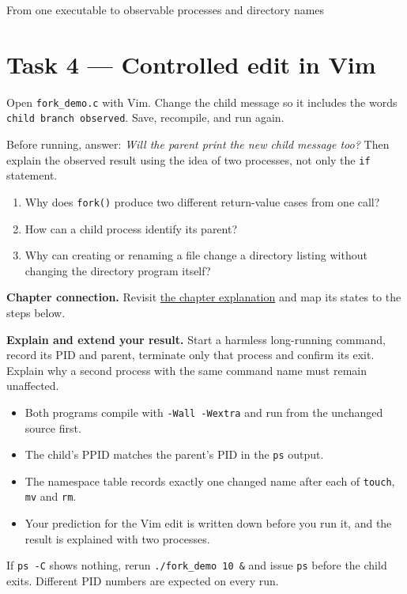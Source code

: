 \begin{labproject}{From one executable to observable processes and directory names}
\section*{Task 4 --- Controlled edit in Vim}
Open \texttt{fork\_demo.c} with Vim. Change the child message so it includes the words \texttt{child branch observed}. Save, recompile, and run again.

Before running, answer: \emph{Will the parent print the new child message too?} Then explain the observed result using the idea of two processes, not only the \texttt{if} statement.

\begin{quickcheck}
\begin{enumerate}
  \item Why does \texttt{fork()} produce two different return-value cases from one call?
  \item How can a child process identify its parent?
  \item Why can creating or renaming a file change a directory listing without changing the directory program itself?
\end{enumerate}
\end{quickcheck}

\textbf{Chapter connection.} Revisit \hyperref[ch:processes]{the chapter explanation} and map its states to the steps below.


\begin{verification}
\textbf{Explain and extend your result.} Start a harmless long-running command, record its PID and parent, terminate only that process and confirm its exit. Explain why a second process with the same command name must remain unaffected.


\begin{itemize}
  \item Both programs compile with \texttt{-Wall -Wextra} and run from the unchanged source first.
  \item The child's PPID matches the parent's PID in the \texttt{ps} output.
  \item The namespace table records exactly one changed name after each of \texttt{touch}, \texttt{mv} and \texttt{rm}.
  \item Your prediction for the Vim edit is written down before you run it, and the result is explained with two processes.
\end{itemize}
\end{verification}

\begin{troubleshoot}
If \texttt{ps -C} shows nothing, rerun \texttt{./fork\_demo 10 \&} and issue \texttt{ps} before the child exits. Different PID numbers are expected on every run.
\end{troubleshoot}
\end{labproject}
